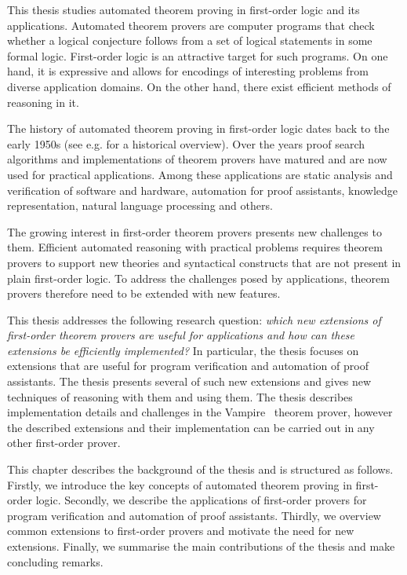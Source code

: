 
This thesis studies automated theorem proving in first-order logic and its applications. Automated theorem provers are computer programs that check whether a logical conjecture follows from a set of logical statements in some formal logic. First-order logic is an attractive target for such programs. On one hand, it is expressive and allows for encodings of interesting problems from diverse application domains. On the other hand, there exist efficient methods of reasoning in it.

The history of automated theorem proving in first-order logic dates back to the early 1950s (see e.g. \cite{bundy1999survey,davis2001early,harrison2007short} for a historical overview). Over the years proof search algorithms and implementations of theorem provers have matured and are now used for practical applications. Among these applications are static analysis and verification of software and hardware, automation for proof assistants, knowledge representation, natural language processing and others.

The growing interest in first-order theorem provers presents new challenges to them. Efficient automated reasoning with practical problems requires theorem provers to support new theories and syntactical constructs that are not present in plain first-order logic. To address the challenges posed by applications, theorem provers therefore need to be extended with new features.

This thesis addresses the following research question: \emph{which new extensions of first-order theorem provers are useful for applications and how can these extensions be efficiently implemented?} In particular, the thesis focuses on extensions that are useful for program verification and automation of proof assistants. The thesis presents several of such new extensions and gives new techniques of reasoning with them and using them. The thesis describes implementation details and challenges in the Vampire~\cite{Vampire13} theorem prover, however the described extensions and their implementation can be carried out in any other first-order prover.

This chapter describes the background of the thesis and is structured as follows. Firstly, we introduce the key concepts of automated theorem proving in first-order logic. Secondly, we describe the applications of first-order provers for program verification and automation of proof assistants. Thirdly, we overview common extensions to first-order provers and motivate the need for new extensions. Finally, we summarise the main contributions of the thesis and make concluding remarks.

